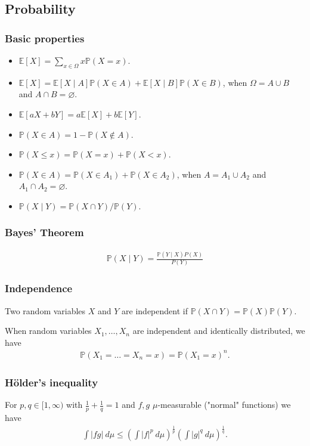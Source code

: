 \subsection{Probability}

\subsubsection{Basic properties}
\begin{itemize}
    \item $\mathbb E[X] = \sum_{x \in \Omega} x\mathbb P(X = x)$.
    \item $\mathbb E[X] = \mathbb E[X \mid A]\mathbb P(X \in A) + \mathbb E[X \mid B]\mathbb P(X \in B)$, when $\Omega = A \cup B$ and $A \cap B = \varnothing$.
    \item $\mathbb E[aX + bY] = a\mathbb E[X] + b\mathbb E[Y]$.
    \item $\mathbb P(X \in A) = 1 - \mathbb P(X \not\in A)$.
    \item $\mathbb P(X \leq x) = \mathbb P(X = x) + \mathbb P(X < x)$.
    \item $\mathbb P(X \in A) = \mathbb P(X \in A_1) + \mathbb P(X \in A_2)$, when $A = A_1 \cup A_2$ and $A_1 \cap A_2 = \varnothing$.
    \item $\mathbb P(X \mid Y) = \mathbb P(X \cap Y) / \mathbb P(Y)$.
\end{itemize}

\subsubsection{Bayes' Theorem}
\begin{align*}
    \mathbb P(X \mid Y) = \frac{\mathbb P(Y \mid X)P(X)}{P(Y)}
\end{align*}

\subsubsection{Independence}
Two random variables $X$ and $Y$ are independent if $\mathbb P(X \cap Y) = \mathbb P(X)\mathbb P(Y)$.

When random variables $X_1, \dots, X_n$ are independent and identically distributed, we have
\begin{align*}
    \mathbb P(X_1 = \dots = X_n = x) = \mathbb P(X_1 = x)^n.
\end{align*}

\subsubsection{Hölder's inequality}
For $p, q \in [1, \infty)$ with $\frac1p + \frac1q = 1$ and $f, g$ $\mu$-measurable ("normal" functions) we have
\begin{align*}
    \int |fg|\ d\mu \leq \left(\int |f|^p\ d\mu\right)^{\frac1p}\left(\int |g|^q\ d\mu\right)^{\frac1q}.
\end{align*}

